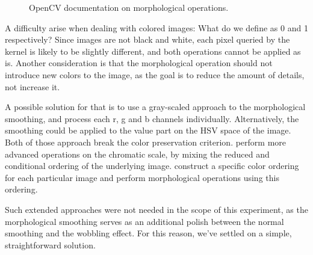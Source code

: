 \documentclass{article}
\begin{document}
\begin{figure}[h]
    \centering
    \hspace{1em}
    \caption{OpenCV documentation on morphological operations.}
    \label{fig:opencv-morph}
\end{figure}

\noindent
A difficulty arise when dealing with colored images: What do we define as 0 and 1 respectively? 
Since images are not black and white, each pixel queried by the kernel is likely to be slightly different, 
and both operations cannot be applied as is. Another consideration is that the morphological operation 
should not introduce new colors to the image, as the goal is to reduce the amount of details, not increase it.

\medskip \par
\noindent
A possible solution for that is to use a gray-scaled approach to the morphological smoothing, and process each
r, g and b channels individually. Alternatively, the smoothing could be applied to the value part on the HSV 
space of the image. Both of those approach break the color preservation criterion. 
\cite{morph_colors_1} perform more advanced operations on the chromatic scale, by mixing the reduced 
and conditional ordering of the underlying image. 
\cite{morph_colors_2} construct a specific color ordering for each particular image and perform morphological 
operations using this ordering.

\medskip \par
\noindent
Such extended approaches were not needed in the scope of this experiment, as the morphological smoothing serves
as an additional polish between the normal smoothing and the wobbling effect. For this reason, we've settled on 
a simple, straightforward solution. 
\end{document}
